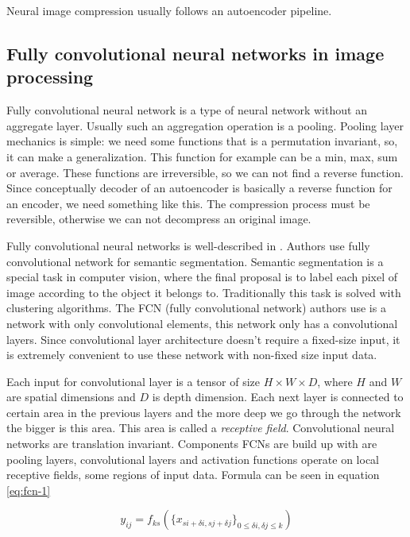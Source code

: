 Neural image compression usually follows an autoencoder pipeline.

\subsection{Fully convolutional neural networks in image processing}

Fully convolutional neural network is a type of neural network without an aggregate layer. Usually such an aggregation operation is a pooling. Pooling layer mechanics is simple: we need some functions that is a permutation invariant, so, it can make a generalization. This function for example can be a min, max, sum or average. These functions are irreversible, so we can not find a reverse function. Since conceptually decoder of an autoencoder is basically a reverse function for an encoder, we need something like this. The compression process must be reversible, otherwise we can not decompress an original image.

Fully convolutional neural networks is well-described in \cite{fcn}. Authors use fully convolutional network for semantic segmentation. Semantic segmentation is a special task in computer vision, where the final proposal is to label each pixel of image according to the object it belongs to. Traditionally this task is solved with clustering algorithms. The FCN (fully convolutional network) authors use is a network with only convolutional elements, this network only has a convolutional layers. Since convolutional layer architecture doesn't require a fixed-size input, it is extremely convenient to use these network with non-fixed size input data.

Each input for convolutional layer is a tensor of size $H \times W \times D$, where $H$ and $W$ are spatial dimensions and $D$ is depth dimension. Each next layer is connected to certain area in the previous layers and the more deep we go through the network the bigger is this area. This area is called a \textit{receptive field}. Convolutional neural networks are translation invariant. Components FCNs are build up with are pooling layers, convolutional layers and activation functions operate on local receptive fields, some regions of input data. Formula can be seen in equation \ref{eq:fcn-1}

\begin{equation}
    \label{eq:fcn-1}
    y_{ij} = f_{ks}(\{ x_{si + \delta i, sj + \delta j} \}_{0 \le \delta i, \delta j \le k})
\end{equation}

